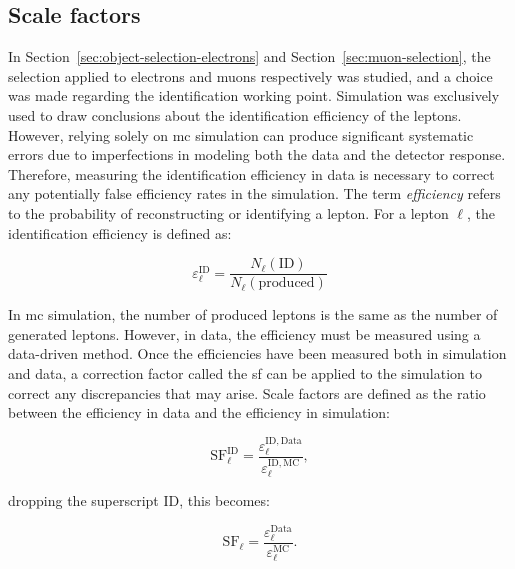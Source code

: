 \clearpage

\subsection{Scale factors}
\label{sec:scale-factors}

In Section~\ref{sec:object-selection-electrons} and Section~\ref{sec:muon-selection}, the selection applied to electrons and muons respectively was studied, and a choice was made regarding the identification working point. Simulation was exclusively used to draw conclusions about the identification efficiency of the leptons. However, relying solely on \gls{mc} simulation can produce significant systematic errors due to imperfections in modeling both the data and the detector response. Therefore, measuring the identification efficiency in data is necessary to correct any potentially false efficiency rates in the simulation. The term \emph{efficiency} refers to the probability of reconstructing or identifying a lepton. For a lepton $\ell$, the identification efficiency is defined as:

\begin{equation}
\varepsilon_{\ell}^{\mathrm{ID}} = \frac{N_{\ell}(\mathrm{ID})}{N_{\ell}(\mathrm{produced})}
\end{equation}

In \gls{mc} simulation, the number of produced leptons is the same as the number of generated leptons. However, in data, the efficiency must be measured using a data-driven method. Once the efficiencies have been measured both in simulation and data, a correction factor called the \gls{sf} can be applied to the simulation to correct any discrepancies that may arise. Scale factors are defined as the ratio between the efficiency in data and the efficiency in simulation:

\begin{equation}
\mathrm{SF}_{\ell}^{\mathrm{ID}}=\frac{\varepsilon_{\ell}^{\mathrm{ID,Data}}}{\varepsilon_{\ell}^{\mathrm{ID,MC}}},
\end{equation}

dropping the superscript ID, this becomes:

\begin{equation}
\mathrm{SF}_{\ell}=\frac{\varepsilon_{\ell}^{\mathrm{Data}}}{\varepsilon_{\ell}^{\mathrm{MC}}}.
\end{equation}

